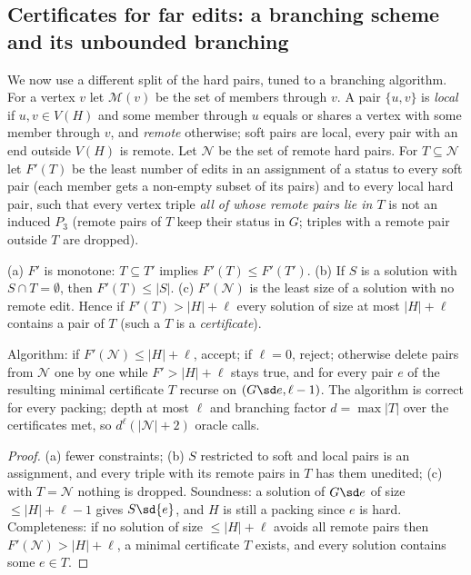 \subsection{Certificates for far edits: a branching scheme and its unbounded branching}\label{sec:softcert}
We now use a different split of the hard pairs, tuned to a branching algorithm. For a vertex $v$ let $\mathcal M(v)$ be the set of members through $v$. A pair $\{u,v\}$ is \emph{local} if $u,v\in V(H)$ and some member through $u$ equals or shares a vertex with some member through $v$, and \emph{remote} otherwise; soft pairs are local, every pair with an end outside $V(H)$ is remote. Let $\mathcal N$ be the set of remote hard pairs. For $T\subseteq\mathcal N$ let $F'(T)$ be the least number of edits in an assignment of a status to every soft pair (each member gets a non-empty subset of its pairs) and to every local hard pair, such that every vertex triple \emph{all of whose remote pairs lie in $T$} is not an induced $P_3$ (remote pairs of $T$ keep their status in $G$; triples with a remote pair outside $T$ are dropped).
\begin{lemma}[Certificates]\label{lem:cert}
(a) $F'$ is monotone: $T\subseteq T'$ implies $F'(T)\le F'(T')$. (b) If $S$ is a solution with $S\cap T=\emptyset$, then $F'(T)\le|S|$. (c) $F'(\mathcal N)$ is the least size of a solution with no remote edit. Hence if $F'(T)>|H|+\ell$ every solution of size at most $|H|+\ell$ contains a pair of $T$ (such a $T$ is a \emph{certificate}).
\end{lemma}
\begin{theorem}\label{thm:B1}
Algorithm: if $F'(\mathcal N)\le|H|+\ell$, accept; if $\ell=0$, reject; otherwise delete pairs from $\mathcal N$ one by one while $F'>|H|+\ell$ stays true, and for every pair $e$ of the resulting minimal certificate $T$ recurse on $(G\sd e,\ell-1)$. The algorithm is correct for every packing; depth at most $\ell$ and branching factor $d=\max|T|$ over the certificates met, so $d^{\ell}(|\mathcal N|+2)$ oracle calls.
\end{theorem}
\begin{proof}
(a) fewer constraints; (b) $S$ restricted to soft and local pairs is an assignment, and every triple with its remote pairs in $T$ has them unedited; (c) with $T=\mathcal N$ nothing is dropped. Soundness: a solution of $G\sd e$ of size $\le|H|+\ell-1$ gives $S\sd\{e\}$, and $H$ is still a packing since $e$ is hard. Completeness: if no solution of size $\le|H|+\ell$ avoids all remote pairs then $F'(\mathcal N)>|H|+\ell$, a minimal certificate $T$ exists, and every solution contains some $e\in T$.
\end{proof}
